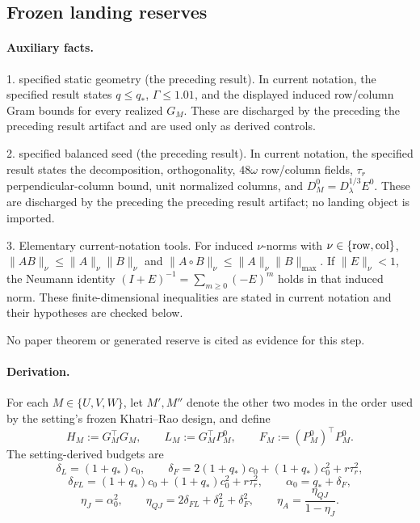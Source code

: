 \subsection{Frozen landing reserves}\label{app:step-009}

\paragraph{Auxiliary facts.}

1. specified static geometry (the preceding result). In current notation, the
   specified result states \(q\le q_*\), \(\Gamma\le1.01\), and the displayed
   induced row/column Gram bounds for every realized \(G_M\). These are
   discharged by the preceding the preceding result artifact and are used only as
   derived controls.

2. specified balanced seed (the preceding result). In current notation, the specified result states the decomposition, orthogonality, \(48\omega\) row/column
   fields, \(\tau_r\) perpendicular-column bound, unit normalized columns,
   and \(D_M^0=D_\lambda^{1/3}E^0\). These are discharged by the preceding
   the preceding result artifact; no landing object is imported.

3. Elementary current-notation tools. For induced \(\nu\)-norms with
   \(\nu\in\{{\rm row},{\rm col}\}\),
   \(\|AB\|_\nu\le\|A\|_\nu\|B\|_\nu\) and
   \(\|A\circ B\|_\nu\le\|A\|_\nu\|B\|_{\max}\). If
   \(\|E\|_\nu<1\), the Neumann identity
   \((I+E)^{-1}=\sum_{m\ge0}(-E)^m\) holds in that induced norm. These
   finite-dimensional inequalities are stated in current notation and their
   hypotheses are checked below.

No paper theorem or generated reserve is cited as evidence for this step.

\paragraph{Derivation.}

For each \(M\in\{U,V,W\}\), let \(M',M''\) denote the other two modes in
the order used by the setting's frozen Khatri--Rao design, and define
\[
 H_M:=G_M^\top G_M,\qquad
 L_M:=G_M^\top P_M^0,\qquad
 F_M:=(P_M^0)^\top P_M^0.
\]
The setting-derived budgets are
\[
\delta_L=(1+q_*)c_0,\qquad
\delta_F=2(1+q_*)c_0+(1+q_*)c_0^2+r\tau_r^2,
\]
\[
\delta_{FL}=(1+q_*)c_0+(1+q_*)c_0^2+r\tau_r^2,\qquad
\alpha_0=q_*+\delta_F,
\]
\[
\eta_J=\alpha_0^2,\qquad
\eta_{QJ}=2\delta_{FL}+\delta_L^2+\delta_F^2,\qquad
\eta_A=\frac{\eta_{QJ}}{1-\eta_J}.
\]


